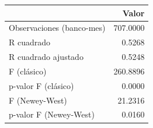 \begin{tabular}{lr}
\toprule
 & Valor \\
\midrule
Observaciones (banco-mes) & 707.0000 \\
R cuadrado & 0.5268 \\
R cuadrado ajustado & 0.5248 \\
F (clásico) & 260.8896 \\
p-valor F (clásico) & 0.0000 \\
F (Newey-West) & 21.2316 \\
p-valor F (Newey-West) & 0.0160 \\
\bottomrule
\end{tabular}
